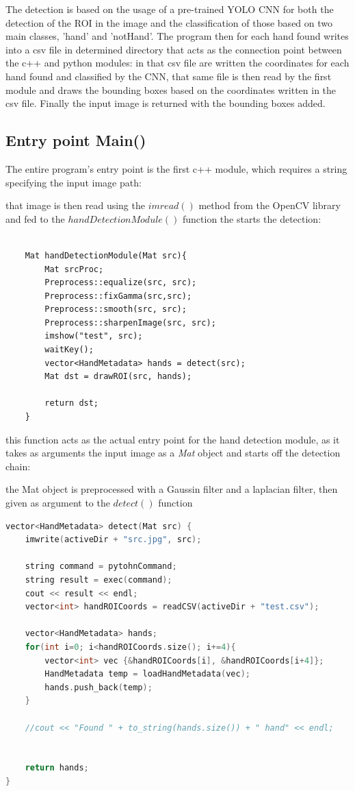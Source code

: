 The detection is based on the usage of a pre-trained YOLO CNN for both the detection of the ROI in the image and the classification 
of those based on two main classes, 'hand' and 'notHand'. The program then for each hand found writes into a csv file in determined 
directory that acts as the connection point between the c++ and python modules: in that csv file are written the coordinates for each hand found and classified
by the CNN, that same file is then read by the first module and draws the bounding boxes based on the coordinates written in the csv file. Finally the input image is 
returned with the bounding boxes added.

\subsection{Entry point Main()}

The entire program's entry point is the first c++ module, which requires a string specifying the input image path:

that image is then read using the $imread()$ method from the OpenCV library and fed to the $handDetectionModule()$ function the starts the detection: 

\begin{lstlisting}

    Mat handDetectionModule(Mat src){
        Mat srcProc;
        Preprocess::equalize(src, src);
        Preprocess::fixGamma(src,src);
        Preprocess::smooth(src, src);
        Preprocess::sharpenImage(src, src);
        imshow("test", src);
        waitKey();
        vector<HandMetadata> hands = detect(src);
        Mat dst = drawROI(src, hands);
    
        return dst;
    }

\end{lstlisting}
this function acts as the actual entry point for the hand detection module, as it takes as arguments the input image as a \textit{Mat} object and 
starts off the detection chain:

the Mat object is preprocessed with a Gaussin filter and a laplacian filter, then given as argument to the $detect()$ function

\begin{lstlisting}[language = c++]
    vector<HandMetadata> detect(Mat src) {
    imwrite(activeDir + "src.jpg", src);

    string command = pytohnCommand;
    string result = exec(command);
    cout << result << endl;
    vector<int> handROICoords = readCSV(activeDir + "test.csv");

    vector<HandMetadata> hands;
    for(int i=0; i<handROICoords.size(); i+=4){
        vector<int> vec {&handROICoords[i], &handROICoords[i+4]};
        HandMetadata temp = loadHandMetadata(vec);
        hands.push_back(temp);
    }
    
    //cout << "Found " + to_string(hands.size()) + " hand" << endl;
    
    
    return hands;
}
\end{lstlisting}

